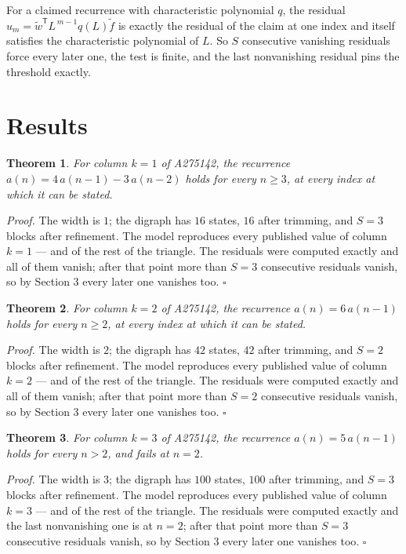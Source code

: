 \documentclass[11pt]{article}
\newtheorem{theorem}{Theorem}
\theoremstyle{definition}
\begin{document}
For a claimed recurrence with characteristic polynomial $q$, the residual $u_m = \tilde w^{\mathsf T}L^{\,m-1}q(L)\tilde f$ is exactly the residual of the claim at one index and itself satisfies the characteristic polynomial of $L$. So $S$ consecutive vanishing residuals force every later one, the test is finite, and the last nonvanishing residual pins the threshold exactly.

\section{Results}

\begin{theorem} For column $k = 1$ of A275142, the recurrence $a(n) = 4\,a(n-1) - 3\,a(n-2)$ holds for every $n \ge 3$, at every index at which it can be stated.\end{theorem}

{\itshape Proof.} The width is $1$; the digraph has $16$ states, $16$ after trimming, and $S = 3$ blocks after refinement. The model reproduces every published value of column $k = 1$ --- and of the rest of the triangle. The residuals were computed exactly and all of them vanish; after that point more than $S = 3$ consecutive residuals vanish, so by Section 3 every later one vanishes too. $\square$

\begin{theorem} For column $k = 2$ of A275142, the recurrence $a(n) = 6\,a(n-1)$ holds for every $n \ge 2$, at every index at which it can be stated.\end{theorem}

{\itshape Proof.} The width is $2$; the digraph has $42$ states, $42$ after trimming, and $S = 2$ blocks after refinement. The model reproduces every published value of column $k = 2$ --- and of the rest of the triangle. The residuals were computed exactly and all of them vanish; after that point more than $S = 2$ consecutive residuals vanish, so by Section 3 every later one vanishes too. $\square$

\begin{theorem} For column $k = 3$ of A275142, the recurrence $a(n) = 5\,a(n-1)$ holds for every $n > 2$, and fails at $n = 2$.\end{theorem}

{\itshape Proof.} The width is $3$; the digraph has $100$ states, $100$ after trimming, and $S = 3$ blocks after refinement. The model reproduces every published value of column $k = 3$ --- and of the rest of the triangle. The residuals were computed exactly and the last nonvanishing one is at $n = 2$; after that point more than $S = 3$ consecutive residuals vanish, so by Section 3 every later one vanishes too. $\square$
\end{document}

